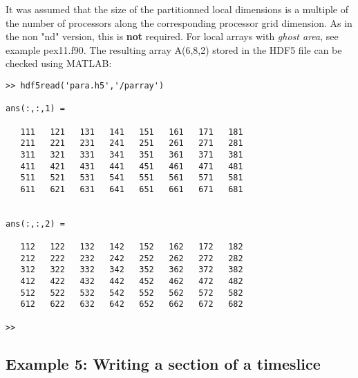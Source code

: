 \documentclass[a4paper]{article}
\begin{document}
It was assumed that the size of the partitionned local dimensions is a
multiple of the number of processors along the corresponding processor grid
dimension. As in the non "nd" version, this is {\bfseries not} required.
For local arrays with {\itshape ghost area\/}, see example {\ttfamily pex11.f90}.
The resulting array {\ttfamily A(6,8,2)} stored in the HDF5 file
can be checked using MATLAB:
\begin{tscreen}
\begin{verbatim}
>> hdf5read('para.h5','/parray')

ans(:,:,1) =

   111   121   131   141   151   161   171   181
   211   221   231   241   251   261   271   281
   311   321   331   341   351   361   371   381
   411   421   431   441   451   461   471   481
   511   521   531   541   551   561   571   581
   611   621   631   641   651   661   671   681


ans(:,:,2) =

   112   122   132   142   152   162   172   182
   212   222   232   242   252   262   272   282
   312   322   332   342   352   362   372   382
   412   422   432   442   452   462   472   482
   512   522   532   542   552   562   572   582
   612   622   632   642   652   662   672   682

>>
\end{verbatim}
\end{tscreen}







\subsection{Example 5: Writing a section of a timeslice}
\end{document}
